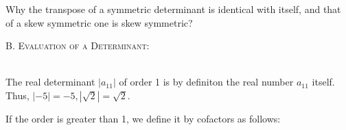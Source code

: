 \documentclass[12pt]{article}
\begin{document}
Why the transpose of a symmetric determinant is identical with itself, and that of a skew symmetric one is skew symmetric?\\

\begin{large} %
\textsc{B. Evaluation of a Determinant:}
\end{large} \\

The real determinant $|a_{11}|$ of order 1 is by definiton the real number $a_{11}$ itself. Thus, $|-5|=-5, |\sqrt{2}|=\sqrt{2}.$ 

If the order is greater than 1, we define it by cofactors as follows:
\end{document}

